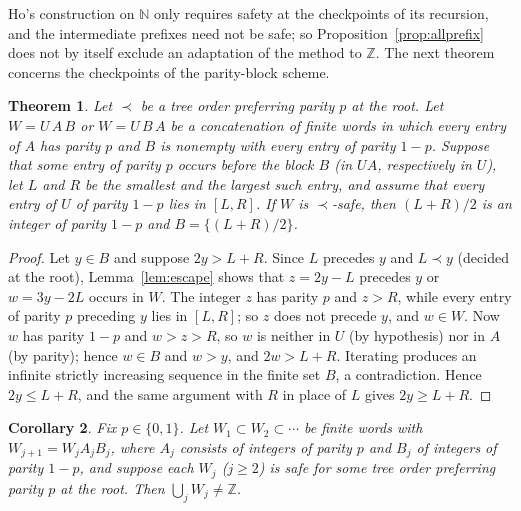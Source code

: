 \documentclass[11pt]{amsart}
\newtheorem{theorem}{Theorem}[section]
\newtheorem{corollary}[theorem]{Corollary}
\theoremstyle{definition}
\theoremstyle{remark}
\newcommand{\Z}{\mathbb{Z}}
\newcommand{\N}{\mathbb{N}}
\begin{document}
Ho's construction on $\N$ only requires safety at the checkpoints of its recursion, and the intermediate prefixes need not be safe; so Proposition~\ref{prop:allprefix} does not by itself exclude an adaptation of the method to $\Z$. The next theorem concerns the checkpoints of the parity-block scheme.

\begin{theorem}\label{thm:block}
Let $\prec$ be a tree order preferring parity $p$ at the root. Let $W=U\,A\,B$ or $W=U\,B\,A$ be a concatenation of finite words in which every entry of $A$ has parity $p$ and $B$ is nonempty with every entry of parity $1-p$. Suppose that some entry of parity $p$ occurs before the block $B$ (in $UA$, respectively in $U$), let $L$ and $R$ be the smallest and the largest such entry, and assume that every entry of $U$ of parity $1-p$ lies in $[L,R]$. If $W$ is $\prec$-safe, then $(L+R)/2$ is an integer of parity $1-p$ and $B=\{(L+R)/2\}$.
\end{theorem}

\begin{proof}
Let $y\in B$ and suppose $2y>L+R$. Since $L$ precedes $y$ and $L\prec y$ (decided at the root), Lemma~\ref{lem:escape} shows that $z=2y-L$ precedes $y$ or $w=3y-2L$ occurs in $W$. The integer $z$ has parity $p$ and $z>R$, while every entry of parity $p$ preceding $y$ lies in $[L,R]$; so $z$ does not precede $y$, and $w\in W$. Now $w$ has parity $1-p$ and $w>z>R$, so $w$ is neither in $U$ (by hypothesis) nor in $A$ (by parity); hence $w\in B$ and $w>y$, and $2w>L+R$. Iterating produces an infinite strictly increasing sequence in the finite set $B$, a contradiction. Hence $2y\le L+R$, and the same argument with $R$ in place of $L$ gives $2y\ge L+R$.
\end{proof}

\begin{corollary}\label{cor:ho}
Fix $p\in\{0,1\}$. Let $W_1\subset W_2\subset\cdots$ be finite words with $W_{j+1}=W_jA_jB_j$, where $A_j$ consists of integers of parity $p$ and $B_j$ of integers of parity $1-p$, and suppose each $W_j$ ($j\ge2$) is safe for some tree order preferring parity $p$ at the root. Then $\bigcup_jW_j\ne\Z$.
\end{corollary}
\end{document}
